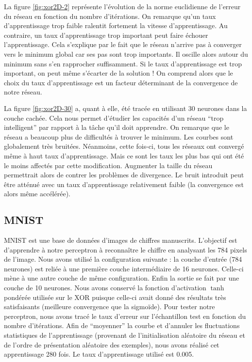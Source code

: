 La figure \ref{fig:xor2D-2} représente l'évolution de la norme euclidienne de l'erreur du réseau en fonction du nombre d'itérations. On remarque qu'un taux 
d'apprentissage trop faible ralentit fortement la vitesse d'apprentissage. Au contraire, un taux d'apprentissage trop important peut faire échouer l'apprentissage.
Cela s'explique par le fait que le réseau n'arrive pas à converger vers le minimum global car ses pas sont trop importants. Il oscille alors autour du minimum sans
s'en rapprocher suffisamment. Si le taux d'apprentissage est trop important, on peut même s'écarter de la solution ! On comprend alors que le choix du taux 
d'apprentissage est un facteur déterminant de la convergence de notre réseau.

La figure \ref{fig:xor2D-30} a, quant à elle, été tracée en utilisant 30 neurones dans la couche cachée. Cela nous permet d'étudier les capacités d'un réseau
``trop intelligent'' par rapport à la tâche qu'il doit apprendre. On remarque que le réseau a beaucoup plus de difficultés à trouver le minimum. Les courbes sont
globalement très bruitées. Néanmoins, cette fois-ci, tous les réseaux ont convergé même à haut taux d'apprentissage. Mais ce sont les taux les plus bas qui ont été
le moins affectés par cette modification. Augmenter la taille du réseau permettrait alors de contrer les problèmes de divergence. Le bruit introduit peut être atténué
avec un taux d'apprentissage relativement faible (la convergence est alors même accélérée).

\subsection{MNIST}

MNIST est une base de données d'images de chiffres manuscrits. L'objectif est d'apprendre à notre perceptron à reconnaître le chiffre en analysant les 784 pixels
de l'image. Nous avons utilisé la configuration suivante : la couche d'entrée (784 neurones) est reliée à une première couche intermédiaire de 16 neurones. Celle-ci
mène à une autre couche de même configuration. Enfin la sortie se fait par une couche de 10 neurones. Nous avons conservé la fonction d'activation $\tanh$ pondérée utilisée
sur le XOR puisque celle-ci avait donné des résultats très satisfaisants (meilleure convergence que la sigmoïde).
Pour tester notre perceptron, nous avons tracé le taux d'erreur sur l'échantillon test en fonction du nombre d'itérations. Afin de ``moyenner'' la courbe et 
d'annuler les fluctuations statistiques de l'apprentissage (provenant de l'initialisation aléatoire du réseau et de l'ordre de présentation aléatoire des exemples),
nous avons réalisé cet apprentissage 280 fois. Le taux d'apprentissage utilisé est 0.005.

